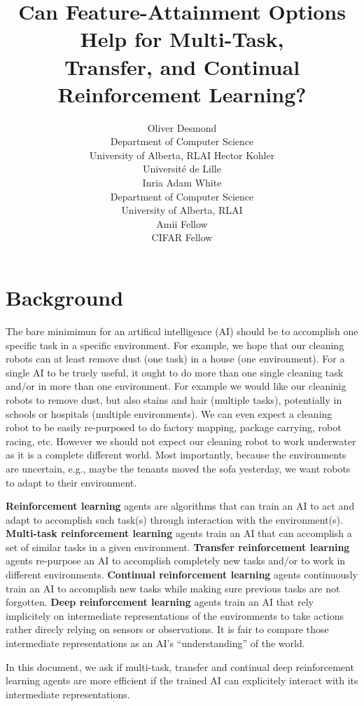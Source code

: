 \documentclass[10pt]{article} %
\title{Can Feature-Attainment Options Help for Multi-Task,\\Transfer, and Continual Reinforcement Learning?}
\author{\name Oliver Desmond  \\
      \addr Department of Computer Science\\
      University of Alberta, RLAI
      \AND
      \name Hector Kohler  \\
      \addr Universit\'e de Lille \\
      Inria
      \AND
      \name Adam White \\
      \addr Department of Computer Science \\
      University of Alberta, RLAI\\
      Amii Fellow \\
      CIFAR Fellow}
\begin{document}
\maketitle

\section{Background}
The bare minimimun for an artifical intelligence (AI) should be to accomplish one specific task in a specific environment.
For example, we hope that our cleaning robots can at least remove dust (one task) in a house (one environment).
For a single AI to be truely useful, it ought to do more than one single cleaning task and/or in more than one environment.
For example we would like our cleaninig robots to remove dust, but also stains and hair (multiple tasks), potentially in schools or hospitals (multiple environments).
We can even expect a cleaning robot to be easily re-purposed to do factory mapping, package carrying, robot racing, etc.
However we should not expect our cleaning robot to work underwater as it is a complete different world.
Most importantly, because the environments are uncertain, e.g., maybe the tenants moved the sofa yesterday, we want robots to adapt to their environment.

\textbf{Reinforcement learning} agents are algorithms that can train an AI to act and adapt to accomplish such task(s) through interaction with the environment(s).
\textbf{Multi-task reinforcement learning} agents train an AI that can accomplish a set of similar tasks in a given environment.
\textbf{Transfer reinforcement learning} agents re-purpose an AI to accomplish completely new tasks and/or to work in different environments.
\textbf{Continual reinforcement learning} agents continuously train an AI to accomplish new tasks while making sure previous tasks are not forgotten.
\textbf{Deep reinforcement learning} agents train an AI that rely implicitely on intermediate representations of the environments to take actions rather direcly relying on sensors or observations.
It is fair to compare those intermediate representations as an AI's ``understanding'' of the world.

In this document, we ask if multi-task, transfer and continual deep reinforcement learning agents are more efficient if the trained AI can explicitely interact with its intermediate representations.
\end{document}
